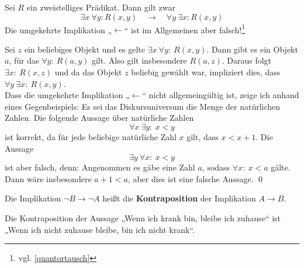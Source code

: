     \begin{sat}
  Sei $R$ ein zweistelliges Prädikat. Dann gilt zwar
  \[ \exists x\ \forall y: R(x,y) \quad\to\quad \forall y\ \exists x: R(x,y) \]  
Die umgekehrte Implikation „$\leftarrow$“ ist im Allgemeinen aber falsch!\footnote{vgl. \cref{quantortausch}}
 \end{sat}
 \begin{bew}
 Sei $z$ ein beliebiges Objekt und es gelte $\exists x\ \forall y:\ R(x,y)$. Dann gibt es ein Objekt $a$, für das $\forall y:\ R(a,y)$ gilt. Also gilt insbesondere $R(a,z)$. Daraus folgt $\exists x:\ R(x,z)$ und da das Objekt $z$ beliebig gewählt war, impliziert dies, dass $\forall y\ \exists x:\ R(x,y)$. \\
 Dass die umgekehrte Implikation „$\leftarrow$“ nicht allgemeingültig ist, zeige ich anhand eines Gegenbeispiels: Es sei das Diskursuniversum die Menge der natürlichen Zahlen. Die folgende Aussage über natürliche Zahlen
 \[ \forall x\ \exists y:\ x < y \]
 ist korrekt, da für jede beliebige natürliche Zahl $x$ gilt, dass $x<x+1$. Die Aussage
 \[ \exists y\ \forall x:\ x<y \]
 ist aber falsch, denn: Angenommen es gäbe eine Zahl $a$, sodass $\forall x:\ x<a$ gälte. Dann wäre insbesondere $a+1<a$, aber dies ist eine falsche Aussage. \qed
 \end{bew}



  

\begin{de}
 Die Implikation $\neg B \to \neg A$ heißt die \textbf{Kontraposition} der Implikation $A\to B$.
\end{de}


\begin{bsp}
 Die Kontraposition der Aussage „Wenn ich krank bin, bleibe ich zuhause“ ist „Wenn ich nicht zuhause bleibe, bin ich nicht krank“.
\end{bsp}






